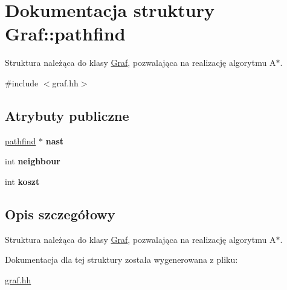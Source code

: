 \hypertarget{struct_graf_1_1pathfind}{\section{\-Dokumentacja struktury \-Graf\-:\-:pathfind}
\label{struct_graf_1_1pathfind}
}


\-Struktura należąca do klasy \hyperlink{class_graf}{\-Graf}, pozwalająca na realizację algorytmu \-A$\ast$.  




{\ttfamily \#include $<$graf.\-hh$>$}

\subsection*{\-Atrybuty publiczne}
\begin{DoxyCompactItemize}
\item 
\hypertarget{struct_graf_1_1pathfind_a67cd49c22eebe65a7397b622b0d51cb9}{\hyperlink{struct_graf_1_1pathfind}{pathfind} $\ast$ {\bfseries nast}}\label{struct_graf_1_1pathfind_a67cd49c22eebe65a7397b622b0d51cb9}

\item 
\hypertarget{struct_graf_1_1pathfind_ad94a96a26d95ce65e360bf5ca6a903e8}{int {\bfseries neighbour}}\label{struct_graf_1_1pathfind_ad94a96a26d95ce65e360bf5ca6a903e8}

\item 
\hypertarget{struct_graf_1_1pathfind_a88bbf0679bed98504a92580bb0b55cd1}{int {\bfseries koszt}}\label{struct_graf_1_1pathfind_a88bbf0679bed98504a92580bb0b55cd1}

\end{DoxyCompactItemize}


\subsection{\-Opis szczegółowy}
\-Struktura należąca do klasy \hyperlink{class_graf}{\-Graf}, pozwalająca na realizację algorytmu \-A$\ast$. 



\-Dokumentacja dla tej struktury została wygenerowana z pliku\-:\begin{DoxyCompactItemize}
\item 
\hyperlink{graf_8hh}{graf.\-hh}\end{DoxyCompactItemize}
